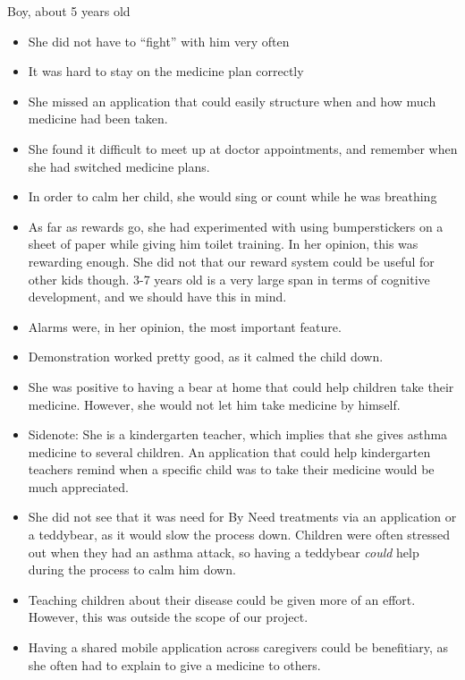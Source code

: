 Boy, about 5 years old
\begin{itemize}
  \item She did not have to ``fight'' with him very often
  \item It was hard to stay on the medicine plan correctly
  \item She missed an application that could easily structure when and how much medicine had been taken.
  \item She found it difficult to meet up at doctor appointments, and remember when she had switched medicine plans. 
  \item In order to calm her child, she would sing or count while he was breathing
  \item As far as rewards go, she had experimented with using bumperstickers on a sheet of paper while giving him toilet training. In her opinion, this was rewarding enough. She did not that our reward system could be useful for other kids though. 3-7 years old is a very large span in terms of cognitive development, and we should have this in mind. 
  \item Alarms were, in her opinion, the most important feature. 
  \item Demonstration worked pretty good, as it calmed the child down. 
  \item She was positive to having a bear at home that could help children take their medicine. However, she would not let him take medicine by himself. 
  \item Sidenote: She is a kindergarten teacher, which implies that she gives asthma medicine to several children. An application that could help kindergarten teachers remind when a specific child was to take their medicine would be much appreciated.
  \item She did not see that it was need for By Need treatments via an application or a teddybear, as it would slow the process down. Children were often stressed out when they had an asthma attack, so having a teddybear \emph{could} help during the process to calm him down. 
  \item Teaching children about their disease could be given more of an effort. However, this was outside the scope of our project. 
  \item Having a shared mobile application across caregivers could be benefitiary, as she often had to explain to give a medicine to others.  
\end{itemize} 




